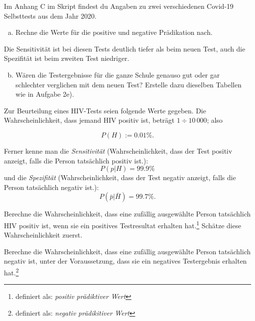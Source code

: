 \documentclass[%
11pt,%
twoside,%
titlepage,%
german,%
headsepline%
]{scrartcl}
\begin{document}
\begin{ueb}[Selbsttest 2020]
Im Anhang C im Skript findest du Angaben zu zwei verschiedenen Covid-19 Selbsttests aus dem Jahr 2020.
\begin{enumerate}[a)]
    \item Rechne die Werte für die positive und negative Prädikation nach.
\end{enumerate}
Die Sensitivität ist bei diesen Tests deutlich tiefer als beim neuen Test, auch die Spezifität ist beim zweiten Test niedriger.
\begin{enumerate}[a)]
\setcounter{enumi}{1}
\item Wären die Testergebnisse für die ganze Schule genauso gut oder gar schlechter verglichen mit dem neuen Test? Erstelle dazu dieselben Tabellen wie in Aufgabe 2e).
\end{enumerate}
\end{ueb}

\begin{ueb}
\label{ueb:hiv}
Zur
Beurteilung eines HIV-Tests seien folgende Werte gegeben. Die Wahrscheinlichkeit, dass jemand HIV positiv ist, beträgt $1\div10\,000$; also

$$P(H):=0.01\%.$$

Ferner kenne man die \emph{Sensitivität} (Wahrscheinlichkeit, dass der Test positiv anzeigt, falls die Person tatsächlich positiv ist.):
$$P(p|H)=99.9\%$$
und die \emph{Spezifität} (Wahrscheinlichkeit, dass der Test negativ anzeigt, falls die Person tatsächlich negativ ist.):
$$P(\bar{p}|\bar{H})=99.7\%.$$

\begin{enumeratea}
\item Berechne die Wahrscheinlichkeit, dass eine zufällig ausgewählte Person tatsächlich HIV positiv ist, wenn sie ein positives Testresultat erhalten hat.\footnote{definiert als: \emph{positiv prädiktiver Wert}} Schätze diese Wahrscheinlichkeit zuerst.
\item Berechne die Wahrscheinlichkeit, dass eine zufällig ausgewählte Person tatsächlich negativ ist, unter der Voraussetzung, dass sie ein negatives Testergebnis erhalten hat.\footnote{definiert als: \emph{negativ prädikitiver Wert}}
\end{enumeratea}

\end{ueb}

\end{document}
